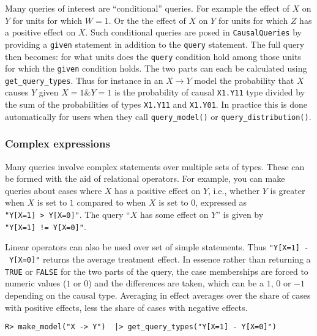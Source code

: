 \documentclass[
  11pt,
  article]{jss}
\begin{document}
Many queries of interest are ``conditional'' queries. For example the
effect of \(X\) on \(Y\) for units for which \(W= 1\). Or the the effect
of \(X\) on \(Y\) for units for which \(Z\) has a positive effect on
\(X\). Such conditional queries are posed in \texttt{CausalQueries} by
providing a \texttt{given} statement in addition to the \texttt{query}
statement. The full query then becomes: for what units does the
\texttt{query} condition hold among those units for which the
\texttt{given} condition holds. The two parts can each be calculated
using \texttt{get\_query\_types}. Thus for instance in an
\(X \rightarrow Y\) model the probability that \(X\) causes \(Y\) given
\(X=1 \& Y=1\) is the probability of causal \texttt{X1.Y11} type divided
by the sum of the probabilities of types \texttt{X1.Y11} and
\texttt{X1.Y01}. In practice this is done automatically for users when
they call \texttt{query\_model()} or \texttt{query\_distribution()}.

\hypertarget{complex-expressions}{%
\subsubsection{Complex expressions}\label{complex-expressions}}

Many queries involve complex statements over multiple sets of types.
These can be formed with the aid of relational operators. For example,
you can make queries about cases where \(X\) has a positive effect on
\(Y\), i.e., whether \(Y\) is greater when \(X\) is set to \(1\)
compared to when \(X\) is set to \(0\), expressed as
\texttt{"Y{[}X=1{]}\ \textgreater{}\ Y{[}X=0{]}"}. The query ``\(X\) has
some effect on \(Y\)'' is given by
\texttt{"Y{[}X=1{]}\ !=\ Y{[}X=0{]}"}.

Linear operators can also be used over set of simple statements. Thus
\texttt{"Y{[}X=1{]}\ -\ Y{[}X=0{]}"} returns the average treatment
effect. In essence rather than returning a \texttt{TRUE} or
\texttt{FALSE} for the two parts of the query, the case memberships are
forced to numeric values (\(1\) or \(0\)) and the differences are taken,
which can be a \(1\), \(0\) or \(-1\) depending on the causal type.
Averaging in effect averages over the share of cases with positive
effects, less the share of cases with negative effects.

\begin{verbatim}
R> make_model("X -> Y")  |> get_query_types("Y[X=1] - Y[X=0]")
\end{verbatim}
\end{document}
